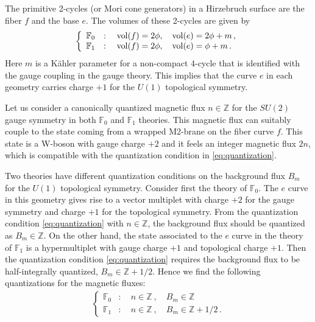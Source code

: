 The primitive 2-cycles (or Mori cone generators) in a Hirzebruch surface are the fiber $f$ and the base $e$. The volumes of these 2-cycles are given by
\begin{align}
\left\{
\begin{array}{ll}
\mathbb{F}_0 &: \quad \operatorname{vol}(f) = 2\phi, \quad \operatorname{vol}(e) = 2\phi + m\,, \\
\mathbb{F}_1 &: \quad \operatorname{vol}(f) = 2\phi, \quad \operatorname{vol}(e) = \phi + m\,.
\end{array} \right. 
\end{align}
Here $m$ is a K\"ahler parameter for a non-compact 4-cycle that is identified with the gauge coupling in the gauge theory. This implies that the curve $e$ in each geometry carries charge $+1$ for the $U(1)$ topological symmetry. 

Let us consider a canonically quantized magnetic flux $n\in\mathbb{Z}$ for the $SU(2)$ gauge symmetry in both $\mathbb{F}_0$ and $\mathbb{F}_1$ theories. This magnetic flux can suitably couple to the state coming from a wrapped M2-brane on the fiber curve $f$. This state is a W-boson with gauge charge $+2$ and it feels an integer magnetic flux $2n$, which is compatible with the quantization condition in \eqref{eq:quantization}.

Two theories have different quantization conditions on the background flux $B_m$ for the $U(1)$ topological symmetry. Consider first the theory of $\mathbb{F}_0$. The $e$ curve in this geometry gives rise to a vector multiplet with charge $+2$ for the gauge symmetry and charge $+1$ for the topological symmetry. From the quantization condition \eqref{eq:quantization} with $n\in\mathbb{Z}$, the background flux should be quantized as $B_m\in\mathbb{Z}$. On the other hand, the state associated to the $e$ curve in the theory of $\mathbb{F}_1$ is a hypermultiplet with gauge charge $+1$ and topological charge $+1$. Then the quantization condition \eqref{eq:quantization} requires the background flux to be half-integrally quantized, $B_m\in\mathbb{Z}+1/2$. Hence we find the following quantizations for the magnetic fluxes:
\begin{align}\label{eq:su2_e_shift}
\left\{
\begin{array}{ll}
\mathbb{F}_0 &: \quad n\in\mathbb{Z} \ , \quad B_m \in \mathbb{Z} \\
\mathbb{F}_1 &: \quad n\in\mathbb{Z} \ , \quad B_m \in \mathbb{Z}+1/2\,.
\end{array}\right.
\end{align}

